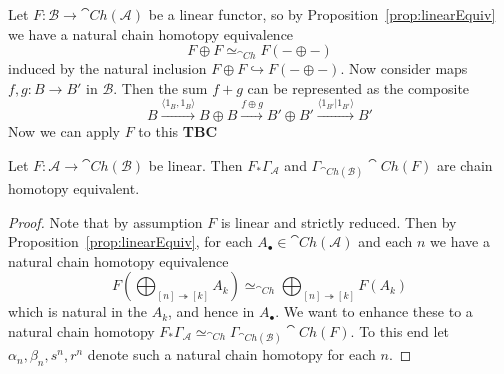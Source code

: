 \begin{rmk}
    Let $F:\mathcal{B}\to \cat{Ch}(\mathcal{A})$ be a linear functor, so by Proposition~\ref{prop:linearEquiv} we have a natural chain homotopy equivalence
    \begin{equation*}
        F\oplus F\simeq_{\cat{Ch}}F(-\oplus -)
    \end{equation*}
    induced by the natural inclusion $F\oplus F\hookrightarrow F(-\oplus -)$. Now consider maps $f,g:B\to B'$ in $\mathcal{B}$. Then the sum $f+g$ can be represented as the composite
    \begin{equation*}
        B\xrightarrow{\langle 1_B,1_B\rangle}B\oplus B\xrightarrow{f\oplus g}B'\oplus B'\xrightarrow{\langle 1_{B'}|1_{B'}\rangle}B'
    \end{equation*}
    Now we can apply $F$ to this  \textbf{TBC}
\end{rmk}



\begin{lem}[label=lem:equivDef]
    Let $F:\mathcal{A}\to \cat{Ch}(\mathcal{B})$ be linear. Then $F_*\Gamma_\mathcal{A}$ and $\Gamma_{\cat{Ch}(\mathcal{B})}\cat{Ch}(F)$ are  chain homotopy equivalent.
\end{lem}
\begin{proof}
    Note that by assumption $F$ is linear and strictly reduced. Then by Proposition~\ref{prop:linearEquiv}, for each $A_\bullet \in \cat{Ch}(\mathcal{A})$ and each $n$ we have a natural chain homotopy equivalence
    \begin{equation*}
        F\left(\bigoplus_{[n]\twoheadrightarrow[k]}A_k\right) \simeq_{\cat{Ch}} \bigoplus_{[n]\twoheadrightarrow[k]}F(A_k)
    \end{equation*}
    which is natural in the $A_k$, and hence in $A_{\bullet}$. We want to enhance these to a natural chain homotopy $F_*\Gamma_\mathcal{A}\simeq_{\cat{Ch}}\Gamma_{\cat{Ch}(\mathcal{B})}\cat{Ch}(F)$. To this end let $\alpha_n,\beta_n,s^n,r^n$ denote such a natural chain homotopy for each $n$. 
\end{proof}
